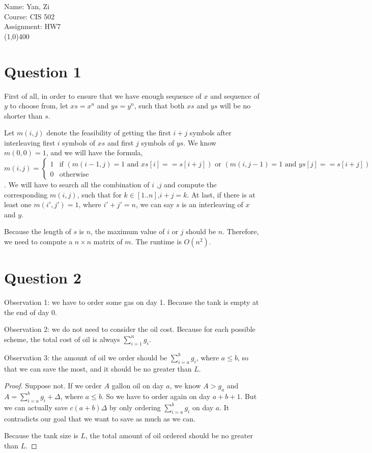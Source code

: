 \documentclass[letter,12pt]{article}
\begin{document}
Name: Yan, Zi \\
Course: CIS 502 \\
Assignment: HW7 \\
\line(1,0){400}
\section*{Question 1}
First of all, in order to ensure that we have enough sequence of $x$ and 
sequence of $y$ to choose from, let $xs = x^n$ and $ys = y^n$, such that both
$xs$ and $ys$ will be no shorter than $s$. 

Let $m(i, j)$ denote the feasibility of getting the first $i+j$ symbols after 
interleaving first $i$ symbols of $xs$ and first $j$ symbols of $ys$. We know 
$m(0, 0) = 1$, and we will have the formula, \\
$ m(i, j) = 
\begin{cases}
1 & \text{if } (m(i - 1, j) = 1 \text{ and } xs[i] == s[i + j]) \text{ or }  
                    (m(i, j -1) = 1 \text{ and } ys[j] == s[i + j]) \\
0 & \text{otherwise}
\end{cases}$. We will have to search all the combination of $i$ ,$j$ and 
compute the corresponding $m(i, j)$, such that for $k \in [1..n]$,$i+j=k$. 
At last, if there is at least one $m(i',j') = 1$, where $i'+j' = n$, we can say $s$
is an interleaving of $x$ and $y$.

Because the length of $s$ is $n$, the maximum value of $i$ or $j$ should be 
$n$. Therefore, we need to compute a $n\times n$ matrix of $m$. The runtime 
is $O(n^2)$.
\section*{Question 2}
Observation 1: we have to order some gas on day 1. Because the tank is empty
at the end of day 0.

Observation 2: we do not need to consider the oil cost. Because for each 
possible scheme, the total cost of oil is always $\sum\limits_{i=1}^n g_i$.

Observation 3: the amount of oil we order should be $\sum\limits_{i=a}^b g_i$,
where $a \le b$, so that we can save the most, and it should be no greater than 
$L$.
\begin{proof}
Suppose not. If we order $A$ gallon oil on day $a$, we know $A>g_a$ and 
$A= \sum\limits_{i=a}^b g_i + \Delta$, where $a \le b$. So we have to order
again on day $a+b+1$. But we can actually save $c(a+b)\Delta$ by only ordering
$\sum\limits_{i=a}^b g_i$ on day $a$. It contradicts our goal that we want to 
save as much as we can.

Because the tank size is $L$, the total amount of oil ordered should be no 
greater than $L$.
\end{proof}
\end{document}
